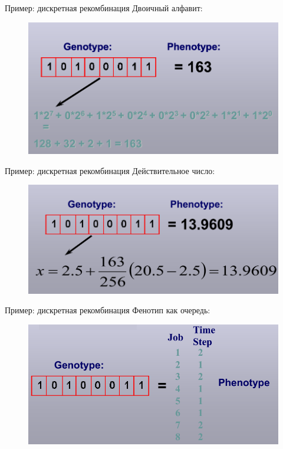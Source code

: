 \documentclass{beamer}
\begin{document}
\begin{frame}{Пример: дискретная рекомбинация}
Двоичный алфавит:
\begin{figure}[h]
\centering
\includegraphics[scale=0.4]{images/lec04-pic25.png}
\end{figure}
\end{frame}

\begin{frame}{Пример: дискретная рекомбинация}
Действительное число:
\begin{figure}[h]
\centering
\includegraphics[scale=0.4]{images/lec04-pic26.png}
\end{figure}
\end{frame}

\begin{frame}{Пример: дискретная рекомбинация}
Фенотип как очередь:
\begin{figure}[h]
\centering
\includegraphics[scale=0.4]{images/lec04-pic27.png}
\end{figure}
\end{frame}
\end{document}
